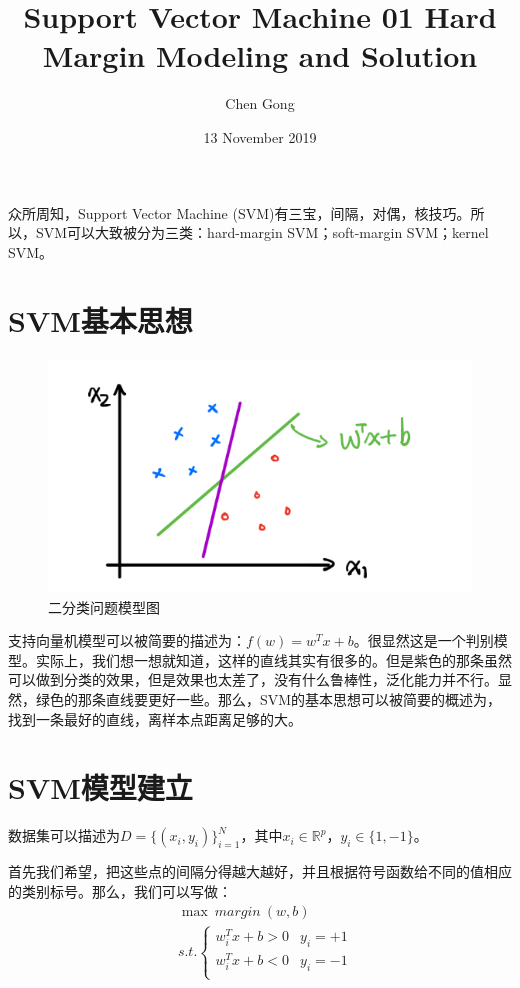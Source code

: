 \documentclass[a4paper]{article}
\title{Support Vector Machine 01 Hard Margin Modeling and Solution}
\author{Chen Gong}
\date{13 November 2019}
\begin{document}
\maketitle

众所周知，Support Vector Machine (SVM)有三宝，间隔，对偶，核技巧。所以，SVM可以大致被分为三类：hard-margin SVM；soft-margin SVM；kernel SVM。

\section{SVM基本思想}
\begin{figure}[H]
    \centering
    \includegraphics[width=.55\textwidth]{微信图片_20191113104442.png}
    \caption{二分类问题模型图}
    \label{fig:my_label_1}
\end{figure}

支持向量机模型可以被简要的描述为：$f(w) = w^Tx + b$。很显然这是一个判别模型。实际上，我们想一想就知道，这样的直线其实有很多的。但是紫色的那条虽然可以做到分类的效果，但是效果也太差了，没有什么鲁棒性，泛化能力并不行。显然，绿色的那条直线要更好一些。那么，SVM的基本思想可以被简要的概述为，找到一条最好的直线，离样本点距离足够的大。

\section{SVM模型建立}
数据集可以描述为$D=\{(x_i,y_i)\}^{N}_{i=1}$，其中$x_i\in\mathbb{R}^{p}$，$y_i\in\{1,-1\}$。

首先我们希望，把这些点的间隔分得越大越好，并且根据符号函数给不同的值相应的类别标号。那么，我们可以写做：
\begin{equation}
    \begin{split}
        & \max \ margin\ (w,b) \\
        & s.t. 
        \left\{
        \begin{array}{ll}
            w^T_ix+b>0 & y_i = +1 \\
            w^T_ix+b<0 & y_i = -1 \\
        \end{array}
        \right.
    \end{split}
\end{equation}
\end{document}

